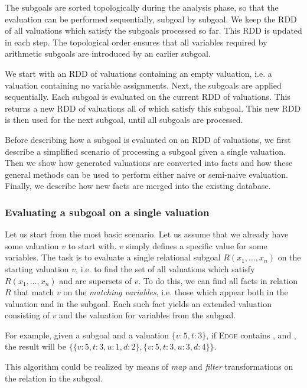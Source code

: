 The subgoals are sorted topologically during the analysis phase, so that the evaluation can be performed sequentially, subgoal by subgoal. We keep the RDD of all valuations which satisfy the subgoals processed so far. This RDD is updated in each step. The topological order ensures that all variables required by arithmetic subgoals are introduced by an earlier subgoal. 

We start with an RDD of valuations containing an empty valuation, i.e. a valuation containing no variable assignments. Next, the subgoals are applied sequentially. Each subgoal is evaluated on the current RDD of valuations. This returns a new RDD of valuations all of which satisfy this subgoal. This new RDD is then used for the next subgoal, until all subgoals are processed.

Before describing how a subgoal is evaluated on an RDD of valuations, we first describe a simplified scenario of processing a subgoal given a single valuation. Then we show how generated valuations are converted into facts and how these general methods can be used to perform either naive or semi-naive evaluation. Finally, we describe how new facts are merged into the existing database.

\subsubsection{Evaluating a subgoal on a single valuation}
Let us start from the most basic scenario. Let us assume that we already have some valuation $v$ to start with. $v$ simply defines a specific value for some variables. The task is to evaluate a single relational subgoal $R(x_1, \dots, x_n)$ on the starting valuation $v$, i.e. to find the set of all valuations which satisfy $R(x_1, \dots, x_n)$ and are supersets of $v$. To do this, we can find all facts in relation $R$ that match $v$ on the \emph{matching variables}, i.e. those which appear both in the valuation and in the subgoal. Each such fact yields an extended valuation consisting of $v$ and the valuation for variables from the subgoal. 

For example, given a subgoal  and a valuation $\{v: 5, t: 3\}$, if \textsc{Edge}  contains ,  and , the result will be $\{\{v: 5, t: 3, u: 1, d: 2\}, \{v: 5, t: 3, u: 3, d: 4\}\}$.

This algorithm could be realized by means of \emph{map} and \emph{filter} transformations on the relation in the subgoal.

